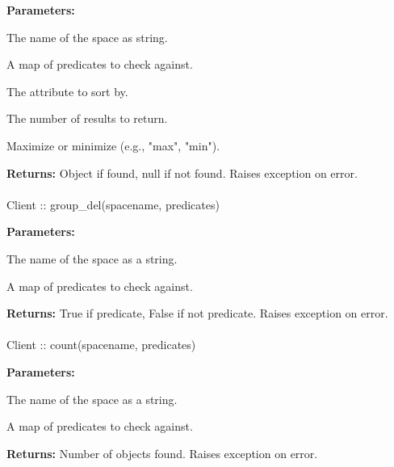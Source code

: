 \noindent\textbf{Parameters:}
\begin{description}[labelindent=\widthof{{\code{predicates}}},leftmargin=*,noitemsep,nolistsep,align=right]
\item[\code{spacename}] The name of the space as string.
\item[\code{predicates}] A map of predicates to check against.
\item[\code{sortby}] The attribute to sort by.
\item[\code{limit}] The number of results to return.
\item[\code{maxmin}] Maximize or minimize (e.g., "max", "min").
\end{description}

\noindent\textbf{Returns:}
Object if found, null if not found.  Raises exception on error.

\paragraph{}
\label{api:java:group_del}
\begin{javacode}
Client :: group_del(spacename, predicates)
\end{javacode}


\noindent\textbf{Parameters:}
\begin{description}[labelindent=\widthof{{\code{predicates}}},leftmargin=*,noitemsep,nolistsep,align=right]
\item[\code{spacename}] The name of the space as a string.
\item[\code{predicates}] A map of predicates to check against.
\end{description}

\noindent\textbf{Returns:}
True if predicate, False if not predicate.  Raises exception on error.

\paragraph{}
\label{api:java:count}
\begin{javacode}
Client :: count(spacename, predicates)
\end{javacode}


\noindent\textbf{Parameters:}
\begin{description}[labelindent=\widthof{{\code{predicates}}},leftmargin=*,noitemsep,nolistsep,align=right]
\item[\code{spacename}] The name of the space as a string.
\item[\code{predicates}] A map of predicates to check against.
\end{description}

\noindent\textbf{Returns:}
Number of objects found.  Raises exception on error.
